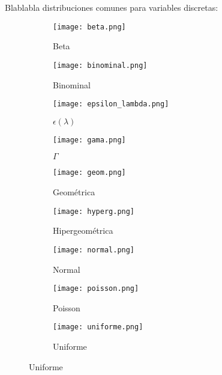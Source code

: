 Blablabla distribuciones comunes para variables discretas:

\begin{figure}[H]
    \begin{subfigure}{.32\textwidth}
        \texttt{[image: beta.png]}
        \caption{Beta}
    \end{subfigure}
    \begin{subfigure}{.32\textwidth}
        \texttt{[image: binominal.png]}
        \caption{Binominal}
    \end{subfigure}
    \begin{subfigure}{.32\textwidth}
        \texttt{[image: epsilon\_lambda.png]}
        \caption{$\epsilon(\lambda)$}
    \end{subfigure}
    \begin{subfigure}{.32\textwidth}
        \texttt{[image: gama.png]}
        \caption{$\Gamma$}
    \end{subfigure}
    \begin{subfigure}{.32\textwidth}
        \texttt{[image: geom.png]}
        \caption{Geométrica}
    \end{subfigure}
    \begin{subfigure}{.32\textwidth}
        \texttt{[image: hyperg.png]}
        \caption{Hipergeométrica}
    \end{subfigure}
    \begin{subfigure}{.32\textwidth}
        \texttt{[image: normal.png]}
        \caption{Normal}
    \end{subfigure}
    \begin{subfigure}{.32\textwidth}
        \texttt{[image: poisson.png]}
        \caption{Poisson}
    \end{subfigure}
    \begin{subfigure}{.32\textwidth}
        \texttt{[image: uniforme.png]}
        \caption{Uniforme}
    \end{subfigure}
\end{figure}